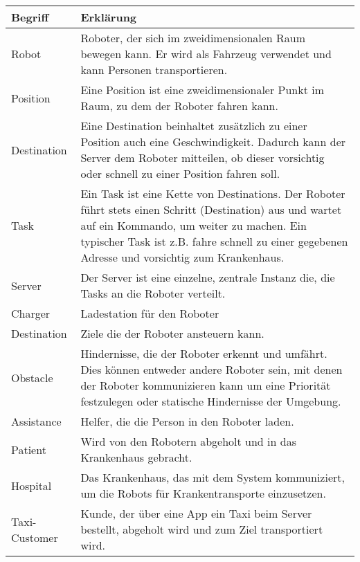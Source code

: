 	\begin{tabularx}{\textwidth}{|l|X|}
		\hline
		\textbf{Begriff} & \textbf{Erklärung}\\ \hline
		Robot & Roboter, der sich im zweidimensionalen Raum bewegen kann. Er wird als Fahrzeug verwendet und kann Personen transportieren.\\ \hline
		Position & Eine Position ist eine zweidimensionaler Punkt im Raum, zu dem der Roboter fahren kann.\\ \hline
		Destination & Eine Destination beinhaltet zusätzlich zu einer Position auch eine Geschwindigkeit. Dadurch kann der Server dem Roboter mitteilen, ob dieser vorsichtig oder schnell zu einer Position fahren soll. \\ \hline
		Task & Ein Task ist eine Kette von Destinations. Der Roboter führt stets einen Schritt (Destination) aus und wartet auf ein Kommando, um weiter zu machen. Ein typischer Task ist z.B. fahre schnell zu einer gegebenen Adresse und vorsichtig zum Krankenhaus.\\ \hline
		Server & Der Server ist eine einzelne, zentrale Instanz die, die Tasks an die Roboter verteilt.\\ \hline
		Charger & Ladestation für den Roboter\\ \hline
		Destination & Ziele die der Roboter ansteuern kann.\\ \hline
		Obstacle & Hindernisse, die der Roboter erkennt und umfährt. Dies können
		entweder andere Roboter sein, mit denen der Roboter kommunizieren kann
		um eine Priorität festzulegen oder statische Hindernisse der
		Umgebung.\\ \hline
		Assistance & Helfer, die die Person in den Roboter laden.\\ \hline
		Patient & Wird von den Robotern abgeholt und in das Krankenhaus gebracht.\\ \hline
		Hospital & Das Krankenhaus, das mit dem System kommuniziert, um die Robots für Krankentransporte einzusetzen. \\ \hline
		Taxi-Customer & Kunde, der über eine App ein Taxi beim Server bestellt, abgeholt wird und zum Ziel transportiert wird.\\ \hline
	\end{tabularx}
